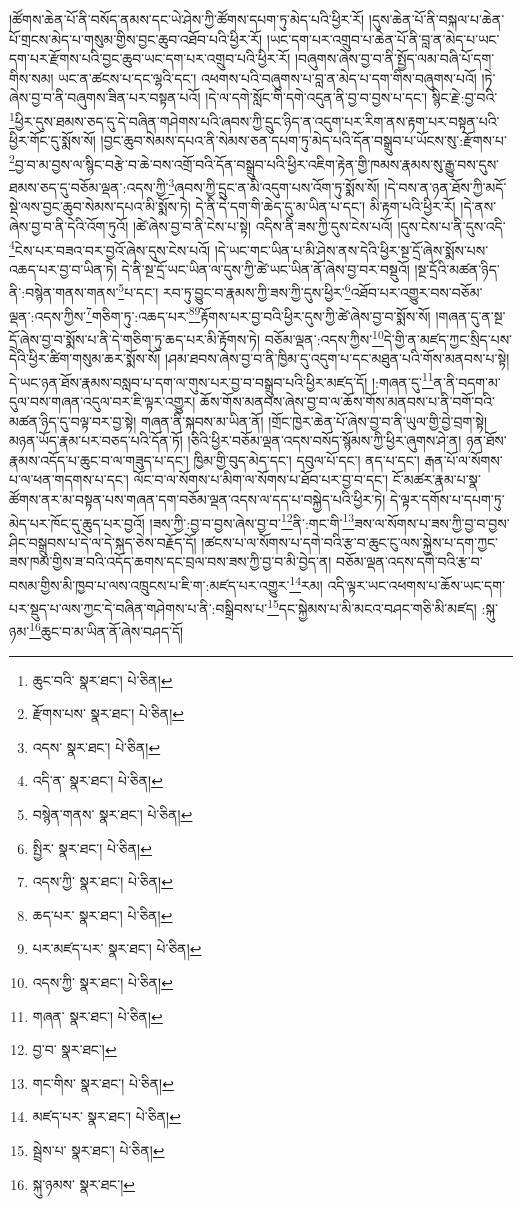 །ཚོགས་ཆེན་པོ་ནི་བསོད་ནམས་དང་ཡེ་ཤེས་ཀྱི་ཚོགས་དཔག་ཏུ་མེད་པའི་ཕྱིར་རོ། །དུས་ཆེན་པོ་ནི་བསྐལ་པ་ཆེན་པོ་གྲངས་མེད་པ་གསུམ་གྱིས་བྱང་ཆུབ་འཐོབ་པའི་ཕྱིར་རོ། །ཡང་དག་པར་འགྲུབ་པ་ཆེན་པོ་ནི་བླ་ན་མེད་པ་ཡང་དག་པར་རྫོགས་པའི་བྱང་ཆུབ་ཡང་དག་པར་འགྲུབ་པའི་ཕྱིར་རོ། །བཞུགས་ཞེས་བྱ་བ་ནི་སྤྱོད་ལམ་བཞི་པོ་དག་གིས་སམ། ཡང་ན་ཚངས་པ་དང་ལྷའི་དང་། འཕགས་པའི་བཞུགས་པ་བླ་ན་མེད་པ་དག་གིས་བཞུགས་པའོ། །ཏེ་ཞེས་བྱ་བ་ནི་བཞུགས་ཟིན་པར་བསྟན་པའོ། །དེ་ལ་དགེ་སློང་གི་དགེ་འདུན་ནི་བྱ་བ་བྱས་པ་དང་། སྙིང་རྗེ་:བྱ་བའི་\footnote{ཆུང་བའི་  སྣར་ཐང་།  པེ་ཅིན། }ཕྱིར་དུས་ཐམས་ཅད་དུ་དེ་བཞིན་གཤེགས་པའི་ཞབས་ཀྱི་དྲུང་ཉིད་ན་འདུག་པར་རིག་ནས་རྟག་པར་བསྟན་པའི་ཕྱིར་གོང་དུ་སྨོས་སོ། །བྱང་ཆུབ་སེམས་དཔའ་ནི་སེམས་ཅན་དཔག་ཏུ་མེད་པའི་དོན་བསྒྲུབ་པ་ཡོངས་སུ་:རྫོགས་པ་\footnote{རྫོགས་པས་  སྣར་ཐང་།  པེ་ཅིན། }བྱ་བ་མ་བྱས་ལ་སྙིང་བརྩེ་བ་ཆེ་བས་འགྲོ་བའི་དོན་བསྒྲུབ་པའི་ཕྱིར་འཇིག་རྟེན་གྱི་ཁམས་རྣམས་སུ་རྒྱུ་བས་དུས་ཐམས་ཅད་དུ་བཅོམ་ལྡན་:འདས་ཀྱི་\footnote{འདས་  སྣར་ཐང་།  པེ་ཅིན། }ཞབས་ཀྱི་དྲུང་ན་མི་འདུག་པས་འོག་ཏུ་སྨོས་སོ། །དེ་བས་ན་ཉན་ཐོས་ཀྱི་མདོ་སྡེ་ལས་བྱང་ཆུབ་སེམས་དཔའ་མི་སྨོས་ཏེ། དེ་ནི་དེ་དག་གི་ཆེད་དུ་མ་ཡིན་པ་དང་། མི་རྟག་པའི་ཕྱིར་རོ། །དེ་ནས་ཞེས་བྱ་བ་ནི་དེའི་འོག་ཏུའོ། །ཚེ་ཞེས་བྱ་བ་ནི་ངེས་པ་སྟེ། འདིས་ནི་ཟས་ཀྱི་དུས་ངེས་པའོ། །དུས་ངེས་པ་ནི་དུས་འདི་\footnote{འདི་ན་  སྣར་ཐང་།  པེ་ཅིན། }ངེས་པར་བཟའ་བར་བྱའོ་ཞེས་དུས་ངེས་པའོ། །དེ་ཡང་གང་ཡིན་པ་མི་ཤེས་ནས་དེའི་ཕྱིར་སྔ་དྲོ་ཞེས་སྨོས་པས་འཆད་པར་བྱ་བ་ཡིན་ཏེ། དེ་ནི་སྔ་དྲོ་ཡང་ཡིན་ལ་དུས་ཀྱི་ཚེ་ཡང་ཡིན་ནོ་ཞེས་བྱ་བར་བསྡུའོ། །སྔ་དྲོའི་མཚན་ཉིད་ནི་:བསྙེན་གནས་གནས་\footnote{བསྙེན་གནས་  སྣར་ཐང་།  པེ་ཅིན། }པ་དང་། རབ་ཏུ་བྱུང་བ་རྣམས་ཀྱི་ཟས་ཀྱི་དུས་ཕྱིར་\footnote{སྤྱིར་  སྣར་ཐང་།  པེ་ཅིན། }འཐོབ་པར་འགྱུར་བས་བཅོམ་ལྡན་:འདས་ཀྱིས་\footnote{འདས་ཀྱི་  སྣར་ཐང་།  པེ་ཅིན། }གཅིག་ཏུ་:འཆད་པར་\footnote{ཆད་པར་  སྣར་ཐང་།  པེ་ཅིན། }\footnote{པར་མཛད་པར་  སྣར་ཐང་།  པེ་ཅིན། }རྟོགས་པར་བྱ་བའི་ཕྱིར་དུས་ཀྱི་ཚེ་ཞེས་བྱ་བ་སྨོས་སོ། །གཞན་དུ་ན་སྔ་དྲོ་ཞེས་བྱ་བ་སྨོས་པ་ནི་དེ་གཅིག་ཏུ་ཆད་པར་མི་རྟོགས་ཏེ། བཅོམ་ལྡན་:འདས་ཀྱིས་\footnote{འདས་ཀྱི་  སྣར་ཐང་།  པེ་ཅིན། }དེ་གྱི་ན་མཛད་ཀྱང་སྲིད་པས་དེའི་ཕྱིར་ཚིག་གསུམ་ཆར་སྨོས་སོ། །ཤམ་ཐབས་ཞེས་བྱ་བ་ནི་ཁྱིམ་དུ་འདུག་པ་དང་མཐུན་པའི་གོས་མནབས་པ་སྟེ། དེ་ཡང་ཉན་ཐོས་རྣམས་བསླབ་པ་དག་ལ་གུས་པར་བྱ་བ་བསྒྲུབ་པའི་ཕྱིར་མཛད་དོ། །:གཞན་དུ་\footnote{གཞན་  སྣར་ཐང་།  པེ་ཅིན། }ན་ནི་བདག་མ་དུལ་བས་གཞན་འདུལ་བར་ཇི་ལྟར་འགྱུར། ཆོས་གོས་མནབས་ཞེས་བྱ་བ་ལ་ཆོས་གོས་མནབས་པ་ནི་བགོ་བའི་མཚན་ཉིད་དུ་བལྟ་བར་བྱ་སྟེ། གཞན་ནི་སྐབས་མ་ཡིན་ནོ། །གྲོང་ཁྱེར་ཆེན་པོ་ཞེས་བྱ་བ་ནི་ཡུལ་གྱི་བྱེ་བྲག་སྟེ། མཉན་ཡོད་རྣམ་པར་བཅད་པའི་དོན་ཏོ། །ཅིའི་ཕྱིར་བཅོམ་ལྡན་འདས་བསོད་སྙོམས་ཀྱི་ཕྱིར་ཞུགས་ཤེ་ན། ཉན་ཐོས་རྣམས་འདོད་པ་ཆུང་བ་ལ་གཟུད་པ་དང་། ཁྱིམ་གྱི་བུད་མེད་དང་། དབུལ་པོ་དང་། ནད་པ་དང་། རྒན་པོ་ལ་སོགས་པ་ལ་ཕན་གདགས་པ་དང་། ལོང་བ་ལ་སོགས་པ་མིག་ལ་སོགས་པ་ཐོབ་པར་བྱ་བ་དང་། ངོ་མཚར་རྣམ་པ་སྣ་ཚོགས་ནར་མ་བསྟན་པས་གཞན་དག་བཅོམ་ལྡན་འདས་ལ་དད་པ་བསྐྱེད་པའི་ཕྱིར་ཏེ། དེ་ལྟར་དགོས་པ་དཔག་ཏུ་མེད་པར་ཁོང་དུ་ཆུད་པར་བྱའོ། །ཟས་ཀྱི་:བྱ་བ་བྱས་ཞེས་བྱ་བ་\footnote{བྱ་བ་  སྣར་ཐང་། }ནི་:གང་གི་\footnote{གང་གིས་  སྣར་ཐང་།  པེ་ཅིན། }ཟས་ལ་སོགས་པ་ཟས་ཀྱི་བྱ་བ་བྱས་ཤིང་བསྒྲུབས་པ་དེ་ལ་དེ་སྐད་ཅེས་བརྗོད་དོ། །ཚངས་པ་ལ་སོགས་པ་དགེ་བའི་རྩ་བ་ཆུང་ངུ་ལས་སྐྱེས་པ་དག་ཀྱང་ཟས་ཁམ་གྱིས་ཟ་བའི་འདོད་ཆགས་དང་བྲལ་བས་ཟས་ཀྱི་བྱ་བ་མི་བྱེད་ན། བཅོམ་ལྡན་འདས་དགེ་བའི་རྩ་བ་བསམ་གྱིས་མི་ཁྱབ་པ་ལས་འཁྲུངས་པ་ཇི་ག་:མཛད་པར་འགྱུར་\footnote{མཛད་པར་  སྣར་ཐང་།  པེ་ཅིན། }རམ། འདི་ལྟར་ཡང་འཕགས་པ་ཆོས་ཡང་དག་པར་སྡུད་པ་ལས་ཀྱང་དེ་བཞིན་གཤེགས་པ་ནི་:བསྒྲིབས་པ་\footnote{སྦྲེས་པ་  སྣར་ཐང་།  པེ་ཅིན། }དང་སྐྱེམས་པ་མི་མངའ་བཤང་གཅི་མི་མཛད། :སྐུ་ཉམ་\footnote{སྐུ་ཉམས་  སྣར་ཐང་། }ཆུང་བ་མ་ཡིན་ནོ་ཞེས་བཤད་དོ། 